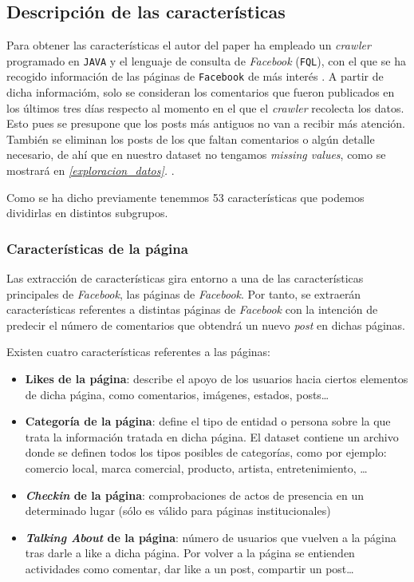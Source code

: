 \documentclass[11pt]{article}
\begin{document}
\subsection{Descripción de las características}

Para obtener las características el autor del paper \cite{original_paper:paper} ha empleado un \emph{crawler} programado en \lstinline{JAVA} y el lenguaje de consulta de \emph{Facebook} (\lstinline{FQL}), con el que se ha recogido información de las páginas de \lstinline{Facebook} de más interés \cite{original_paper:paper}. A partir de dicha informacióm, solo se consideran los comentarios que fueron publicados en los últimos tres días respecto al momento en el que el \emph{crawler} recolecta los datos. Esto pues se presupone que los posts más antiguos no van a recibir más atención. También se eliminan los posts de los que faltan comentarios o algún detalle necesario, de ahí que en nuestro dataset no tengamos \emph{missing values}, como se mostrará en \emph{\ref{exploracion_datos}. }.

Como se ha dicho previamente tenemmos 53 características que podemos dividirlas en distintos subgrupos.

\subsubsection{Características de la página}

Las extracción de características gira entorno a una de las características principales de \emph{Facebook}, las páginas de \emph{Facebook}. Por tanto, se extraerán características referentes a distintas páginas de \emph{Facebook} con la intención de predecir el número de comentarios que obtendrá un nuevo \emph{post} en dichas páginas.

Existen cuatro características referentes a las páginas:

\begin{itemize}
  \item \textbf{Likes de la página}: describe el apoyo de los usuarios hacia ciertos elementos de dicha página, como comentarios, imágenes, estados, posts\ldots

  \item \textbf{Categoría de la página}: define el tipo de entidad o persona sobre la que trata la información tratada en dicha página. El dataset contiene un archivo donde se definen todos los tipos posibles de categorías, como por ejemplo: comercio local, marca comercial, producto, artista, entretenimiento, \ldots

  \item \textbf{\emph{Checkin} de la página}: comprobaciones de actos de presencia en un determinado lugar (sólo es válido para páginas institucionales)

  \item \textbf{\emph{Talking About} de la página}: número de usuarios que vuelven a la página tras darle a like a dicha página. Por volver a la página se entienden actividades como comentar, dar like a un post, compartir un post\ldots
\end{itemize}
\end{document}
